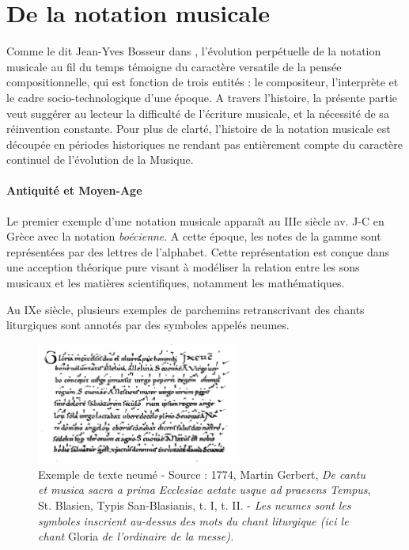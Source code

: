 \section{De la notation musicale}
Comme le dit Jean-Yves Bosseur dans \cite{bosseur2005}, l'évolution perpétuelle de la notation musicale au fil du temps témoigne du caractère versatile de la pensée compositionnelle, qui est fonction de trois entités : le compositeur, l'interprète et le cadre socio-technologique d'une époque.
A travers l'histoire, la présente partie veut suggérer au lecteur la difficulté de l'écriture musicale, et la nécessité de sa réinvention constante.
Pour plus de clarté, l'histoire de la notation musicale est découpée en périodes historiques ne rendant pas entièrement compte du caractère continuel de l'évolution de la Musique.   


\paragraph{Antiquité et Moyen-Age} Le premier exemple d'une notation musicale apparaît au IIIe siècle av. J-C en Grèce avec la notation \textit{boécienne}. A cette époque, les notes de la gamme sont représentées par des lettres de l'alphabet.
Cette représentation est conçue dans une acception théorique pure visant à modéliser la relation entre les sons musicaux et les matières scientifiques, notamment les mathématiques.

Au IXe siècle, plusieurs exemples de parchemins retranscrivant des chants liturgiques sont annotés par des symboles appelés \glspl{neume}.


\begin{figure}[!htbp]
	\centering
	\includegraphics[keepaspectratio=true, width=0.6\textwidth]{Notation/i/neumes.jpg}
	\caption{Exemple de texte neumé - Source : 1774, Martin Gerbert, \textit{De cantu et musica sacra a prima Ecclesiae aetate usque ad praesens Tempus}, St. Blasien, Typis San-Blasianis, t. I, t. II. - \textit{Les neumes sont les symboles inscrient au-dessus des mots du chant liturgique (ici le chant} Gloria \textit{de l'ordinaire de la messe).} }
	\label{fig:neumes}
\end{figure}

